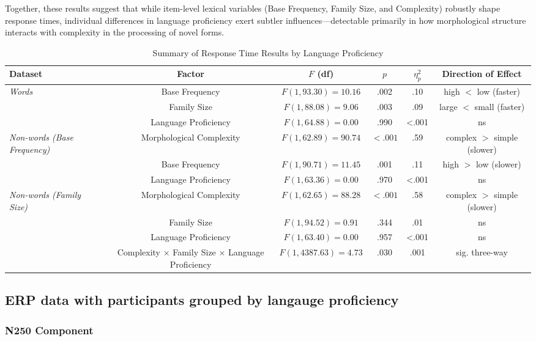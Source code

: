 \documentclass[preprint,12pt, authoryear, review]{elsarticle}
\begin{document}
	Together, these results suggest that while item-level lexical variables (Base Frequency, Family Size, and Complexity) robustly shape response times, individual differences in language proficiency exert subtler influences—detectable primarily in how morphological structure interacts with complexity in the processing of novel forms.
	
	\begin{table}[ht]
		\centering
		\caption{Summary of Response Time Results by Language Proficiency}
		\begin{tabular}{lccccc}
			\toprule
			\textbf{Dataset} & \textbf{Factor} & \textbf{$F$ (df)} & \textbf{$p$} & \textbf{$\eta^2_p$} & \textbf{Direction of Effect} \\
			\midrule
			\textit{Words} & Base Frequency & $F(1, 93.30) = 10.16$ & .002 & .10 & high $<$ low (faster) \\
			& Family Size & $F(1, 88.08) = 9.06$ & .003 & .09 & large $<$ small (faster) \\
			& Language Proficiency & $F(1, 64.88) = 0.00$ & .990 & <.001 & ns \\
			\midrule
			\textit{Non-words (Base Frequency)} & Morphological Complexity & $F(1, 62.89) = 90.74$ & $< .001$ & .59 & complex $>$ simple (slower) \\
			& Base Frequency & $F(1, 90.71) = 11.45$ & .001 & .11 & high $>$ low (slower) \\
			& Language Proficiency & $F(1, 63.36) = 0.00$ & .970 & <.001 & ns \\
			\midrule
			\textit{Non-words (Family Size)} & Morphological Complexity & $F(1, 62.65) = 88.28$ & $< .001$ & .58 & complex $>$ simple (slower) \\
			& Family Size & $F(1, 94.52) = 0.91$ & .344 & .01 & ns \\
			& Language Proficiency & $F(1, 63.40) = 0.00$ & .957 & <.001 & ns \\
			& Complexity × Family Size × Language Proficiency & $F(1, 4387.63) = 4.73$ & .030 & .001 & sig. three-way \\
			\bottomrule
		\end{tabular}
	\end{table}


\subsection{ERP data with participants grouped by langauge proficiency}

\subsubsection{N250 Component}
\end{document}

